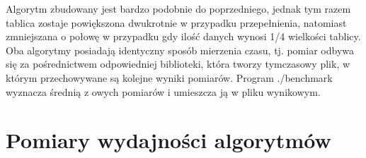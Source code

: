 \documentclass[a4paper,12pt]{article}
\begin{document}
Algorytm zbudowany jest bardzo podobnie do poprzedniego, jednak tym razem 
tablica zostaje powiększona dwukrotnie w przypadku przepełnienia, natomiast
zmniejszana o połowę w przypadku gdy ilość danych wynosi 1/4 wielkości
tablicy.\\

Oba algorytmy posiadają identyczny sposób mierzenia czasu, tj. pomiar odbywa
 się za pośrednictwem odpowiedniej biblioteki, która tworzy
tymczasowy plik, w którym przechowywane są kolejne wyniki pomiarów. Program
./benchmark wyznacza średnią z owych pomiarów i umieszcza ją w pliku 
wynikowym.

\section{Pomiary wydajności algorytmów}
\end{document}
